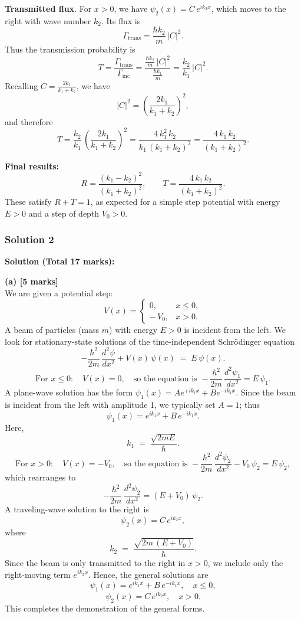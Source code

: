 \documentclass{article}
\begin{document}
\medskip\noindent
\textbf{Transmitted flux}. For $x>0$, we have $\psi_2(x) = C\,e^{i k_2 x}$, which moves to the right with wave number $k_2$. Its flux is
\[
\Gamma_{\mathrm{trans}} 
= \frac{\hbar k_2}{m}\,\bigl|C\bigr|^2.
\]
Thus the transmission probability is
\[
T 
= \frac{\Gamma_{\mathrm{trans}}}{\Gamma_{\mathrm{inc}}} 
= \frac{\frac{\hbar k_2}{m}\,\bigl|C\bigr|^2}{\frac{\hbar k_1}{m}}
= \frac{k_2}{k_1}\,\bigl|C\bigr|^2.
\]
Recalling $C = \tfrac{2k_1}{k_1 + k_2}$, we have
\[
\bigl|C\bigr|^2 = \left(\frac{2k_1}{k_1 + k_2}\right)^2,
\]
and therefore
\[
T 
= \frac{k_2}{k_1}\,\left(\frac{2k_1}{k_1 + k_2}\right)^2
= \frac{4\,k_1^2\,k_2}{k_1\,(k_1 + k_2)^2}
= \frac{4\,k_1\,k_2}{(k_1 + k_2)^2}.
\]

\medskip\noindent
\textbf{Final results:}
\[
R 
= \frac{(k_1 - k_2)^2}{(k_1 + k_2)^2},
\qquad
T 
= \frac{4\,k_1\,k_2}{(k_1 + k_2)^2}.
\]
These satisfy $R + T = 1$, as expected for a simple step potential with energy $E>0$ and a step of depth $V_0>0$.

\subsubsection{Solution 2}

\textbf{Solution (Total 17 marks):}

\bigskip

\textbf{(a) [5 marks]}\\
We are given a potential step:
\[
V(x) =
\begin{cases}
0, & x \le 0, \\
-\,V_0, & x > 0.
\end{cases}
\]
A beam of particles (mass \(m\)) with energy \(E>0\) is incident from the left. We look for stationary-state solutions of the time-independent Schr\"odinger equation
\[
-\frac{\hbar^2}{2m}\,\frac{d^2\psi}{dx^2} + V(x)\,\psi(x)\;=\;E\,\psi(x).
\]
\[
\text{For } x \le 0:\quad V(x)=0, \quad \text{so the equation is } -\frac{\hbar^2}{2m}\,\frac{d^2\psi_1}{dx^2} = E\,\psi_1.
\]
A plane-wave solution has the form \(\psi_1(x) = A e^{+ik_1 x} + B e^{-ik_1 x}\). Since the beam is incident from the left with amplitude 1, we typically set \(A=1\); thus
\[
\psi_1(x) = e^{ik_1 x} + B\,e^{-ik_1 x}.
\]
Here,
\[
k_1 \;=\;\frac{\sqrt{2mE}}{\hbar}.
\]
\[
\text{For } x > 0:\quad V(x)=-V_0, \quad \text{so the equation is } -\frac{\hbar^2}{2m}\,\frac{d^2\psi_2}{dx^2} - V_0\,\psi_2 = E\,\psi_2,
\]
which rearranges to
\[
-\frac{\hbar^2}{2m}\,\frac{d^2\psi_2}{dx^2} = (E + V_0)\,\psi_2.
\]
A traveling-wave solution to the right is
\[
\psi_2(x) = C\, e^{ik_2 x},
\]
where
\[
k_2 \;=\;\frac{\sqrt{2m\,(E+V_0)}}{\hbar}.
\]
Since the beam is only transmitted to the right in \(x>0\), we include only the right-moving term \(e^{ik_2 x}\). Hence, the general solutions are
\[
\psi_1(x) = e^{ik_1 x} + B\,e^{-ik_1 x}, \quad x\le 0,
\]
\[
\psi_2(x) = C\,e^{ik_2 x}, \quad x>0.
\]
This completes the demonstration of the general forms.
\end{document}
